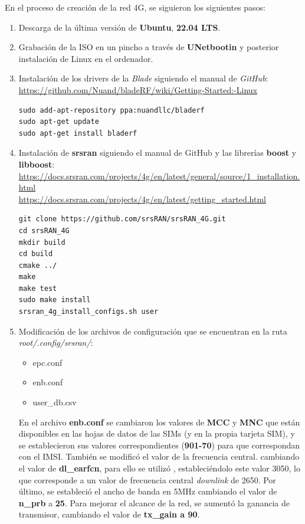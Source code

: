 En el proceso de creación de la red 4G, se siguieron los siguientes pasos:

\begin{enumerate}
\item Descarga de la última versión de \textbf{Ubuntu}, \textbf{22.04 LTS}.
\item Grabación de la ISO en un pincho a través de \textbf{UNetbootin} y posterior instalación de Linux en el ordenador.
\item Instalación de los drivers de la \textit{Blade} siguiendo el manual de \textit{GitHub}:\\
 \url{https://github.com/Nuand/bladeRF/wiki/Getting-Started:-Linux}

\begin{lstlisting}
sudo add-apt-repository ppa:nuandllc/bladerf
sudo apt-get update
sudo apt-get install bladerf
\end{lstlisting}

\item Instalación de \textbf{srsran} siguiendo el manual de GitHub y las librerías \textbf{boost} y \textbf{libboost}:\\
\url{https://docs.srsran.com/projects/4g/en/latest/general/source/1_installation.html}\\
\url{https://docs.srsran.com/projects/4g/en/latest/getting_started.html}

\begin{lstlisting}
git clone https://github.com/srsRAN/srsRAN_4G.git
cd srsRAN_4G
mkdir build
cd build
cmake ../
make
make test
sudo make install
srsran_4g_install_configs.sh user
\end{lstlisting}

\item Modificación de los archivos de configuración que se encuentran en la ruta \textit{root/.config/srsran/}:
\begin{itemize}
	\item epc.conf
	\item enb.conf
	\item user_db.csv
\end{itemize}

En el archivo \textbf{enb.conf} se cambiaron los valores de \textbf{MCC} y \textbf{MNC} que están disponibles en las hojas de datos de las SIMs (y en la propia tarjeta SIM), y se establecieron sus valores correspondientes (\textbf{901-70}) para que correspondan con el IMSI. También se modificó el valor de la frecuencia central. cambiando el valor de \textbf{dl_earfcn}, para ello se utilizó \cite{earn}, estableciéndolo este valor 3050, lo que corresponde a un valor de frecuencia central \textit{downlink} de 2650.  Por último, se estableció el ancho de banda en 5MHz cambiando el valor de \textbf{n_prb} a \textbf{25}. Para mejorar el alcance de la red, se aumentó la ganancia de transmisor, cambiando el valor de \textbf{tx_gain a 90}.


\end{enumerate}
